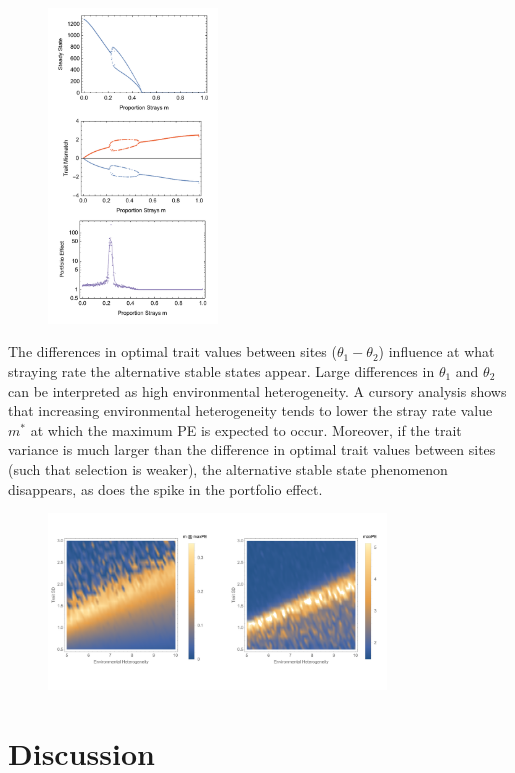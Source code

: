 \documentclass[onecolumn,preprintnumbers,amsmath,amssymb,superscriptaddress]{revtex4}
\begin{document}
\begin{figure}[h]
\centering
\includegraphics[width=0.4\textwidth]{fig_Density.pdf}
\caption{}
\end{figure}


The differences in optimal trait values between sites ($\theta_1-\theta_2$) influence at what straying rate the alternative stable states appear.
Large differences in $\theta_1$ and $\theta_2$ can be interpreted as high environmental heterogeneity.
A cursory analysis shows that increasing environmental heterogeneity tends to lower the stray rate value $m^*$ at which the maximum PE is expected to occur.
Moreover, if the trait variance is much larger than the difference in optimal trait values between sites (such that selection is weaker), the alternative stable state phenomenon disappears, as does the spike in the portfolio effect.


\begin{figure}[h]
\centering
\includegraphics[width=0.8\textwidth]{fig_HSDcomb.png}
\caption{}
\end{figure}


\section*{Discussion}
\end{document}
